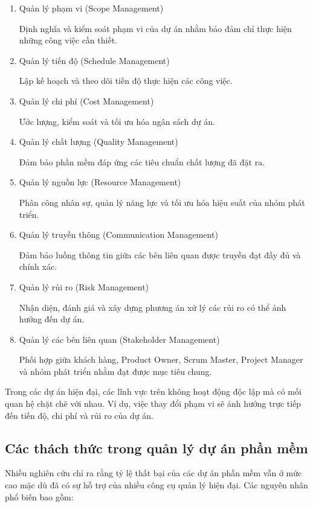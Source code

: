 \documentclass[12pt,a4paper]{report}
\begin{document}
\begin{enumerate}

\item Quản lý phạm vi (Scope Management)

Định nghĩa và kiểm soát phạm vi của dự án nhằm bảo đảm chỉ thực hiện những công việc cần thiết.

\item Quản lý tiến độ (Schedule Management)

Lập kế hoạch và theo dõi tiến độ thực hiện các công việc.

\item Quản lý chi phí (Cost Management)

Ước lượng, kiểm soát và tối ưu hóa ngân sách dự án.

\item Quản lý chất lượng (Quality Management)

Đảm bảo phần mềm đáp ứng các tiêu chuẩn chất lượng đã đặt ra.

\item Quản lý nguồn lực (Resource Management)

Phân công nhân sự, quản lý năng lực và tối ưu hóa hiệu suất của nhóm phát triển.

\item Quản lý truyền thông (Communication Management)

Đảm bảo luồng thông tin giữa các bên liên quan được truyền đạt đầy đủ và chính xác.

\item Quản lý rủi ro (Risk Management)

Nhận diện, đánh giá và xây dựng phương án xử lý các rủi ro có thể ảnh hưởng đến dự án.

\item Quản lý các bên liên quan (Stakeholder Management)

Phối hợp giữa khách hàng, Product Owner, Scrum Master, Project Manager và nhóm phát triển nhằm đạt được mục tiêu chung.

\end{enumerate}

Trong các dự án hiện đại, các lĩnh vực trên không hoạt động độc lập mà có mối quan hệ chặt chẽ với nhau. Ví dụ, việc thay đổi phạm vi sẽ ảnh hưởng trực tiếp đến tiến độ, chi phí và rủi ro của dự án.

\subsection{Các thách thức trong quản lý dự án phần mềm}
Nhiều nghiên cứu chỉ ra rằng tỷ lệ thất bại của các dự án phần mềm vẫn ở mức cao mặc dù đã có sự hỗ trợ của nhiều công cụ quản lý hiện đại. Các nguyên nhân phổ biến bao gồm:
\end{document}
